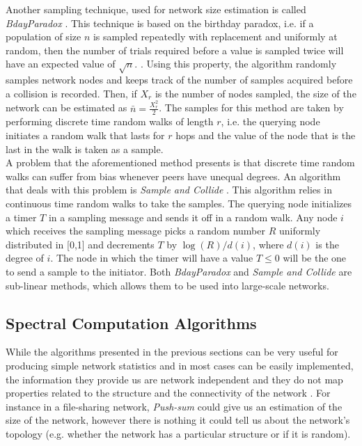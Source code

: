 \documentclass[a4paper,11pt,twoside]{report}
\begin{document}
Another sampling technique, used for network size estimation is called \textit{BdayParadox} \cite{Bawa03estimatingaggregates}. This technique is based on the birthday paradox, i.e. if a population of size $n$ is sampled repeatedly with replacement and uniformly at random, then the number of trials required before a value is sampled twice will have an expected value of $\sqrt{n}$. \cite{Motwani:1995:RA:211390}. Using this property, the algorithm randomly samples network nodes and keeps track of the number of samples acquired before a collision is recorded. Then, if $X_r$ is the number of nodes sampled, the size of the network can be estimated as $\bar{n}=\frac{X_r^2}{2}$. The samples for this method are taken by performing discrete time random walks of length $r$, i.e. the querying node initiates a random walk that lasts for $r$ hops and the value of the node that is the last in the walk is taken as a sample. \\

A problem that the aforementioned method presents is that discrete time random walks can suffer from bias whenever peers have unequal degrees. An algorithm that deals with this problem is \textit{Sample and Collide} \cite{Massoulie:2006:PCS:1146381.1146402}. This algorithm relies in continuous time random walks to take the samples. The querying node initializes a timer $T$ in a sampling message and sends it off in a random walk. Any node $i$ which receives the sampling message picks a random number $R$ uniformly distributed in [0,1] and decrements $T$ by $\log(R)/d(i)$, where $d(i)$ is the degree of $i$. The node in which the timer will have a value $T\leq0$ will be the one to send a sample to the initiator. Both \textit{BdayParadox} and \textit{Sample and Collide} are sub-linear methods, which allows them to be used into large-scale networks. 

\subsection{Spectral Computation Algorithms }

While the algorithms presented in the previous sections can be very useful for producing simple network statistics and in most cases can be easily implemented, the information they provide us are network independent and they do not map properties related to the structure and the connectivity of the network \cite{6195806}. For instance in a file-sharing network, \textit{Push-sum} could give us an estimation of the size of the network, however there is nothing it could tell us about the network's topology (e.g. whether the network has a particular structure or  if it is random). \\
\end{document}
